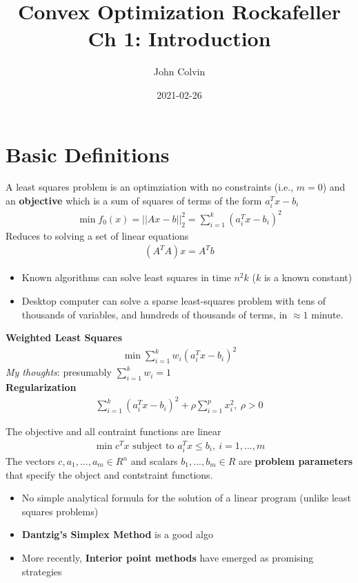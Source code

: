 \documentclass{article}
\title{Convex Optimization Rockafeller Ch 1: Introduction}
\date{2021-02-26}
\author{John Colvin}
\begin{document}
\maketitle
\section{Basic Definitions}
\begin{definition}
  A least squares problem is an optimziation with no constraints (i.e., $m=0$)
  and an \textbf{objective} which is a sum of squares of terms of the form $a_i^Tx-b_i$
  \begin{align}
    \min f_0(x)=||Ax-b||_2^2=\sum_{i=1}^k(a_i^Tx-b_i)^2
  \end{align}
  Reduces to solving a set of linear equations
  \begin{align}
    (A^TA)x=A^Tb
  \end{align}
  \begin{itemize}
    \item Known algorithms can solve least squares in time $n^2k$ ($k$ is a known constant)
    \item Desktop computer can solve a sparse least-squares problem with tens of thousands of variables,
          and hundreds of thousands of terms, in $\approx 1$ minute.
  \end{itemize}
  \begin{headered_note}[Variations]
    \textbf{Weighted Least Squares}
    \begin{align}
      \min \sum_{i=1}^k w_i(a_i^Tx-b_i)^2
    \end{align}
    \textit{My thoughts}: presumably $\sum_{i=1}^k w_i=1$\\
    \vpush
    \textbf{Regularization}
    \begin{align}
      \sum_{i=1}^k(a_i^Tx-b_i)^2+\rho \sum_{i=1}^px_i^2,~\rho>0
    \end{align}
  \end{headered_note}
\end{definition}
\begin{definition}
  The objective and all contraint functions are linear
  \begin{align}
    \min c^Tx \text{ subject to }a_i^Tx\leq b_i,~i=1,...,m
  \end{align}
  The vectors $c,a_1,...,a_m\in R^n$ and scalars $b_1,...,b_m\in R$ are
  \textbf{problem parameters} that specify the object and contstraint functions.
  \begin{itemize}
    \item No simple analytical formula for the solution of a linear program
          (unlike least squares problems)
    \item \textbf{Dantzig's Simplex Method} is a good algo
    \item More recently, \textbf{Interior point methods} have emerged as promising strategies
  \end{itemize}
\end{definition}
\end{document}
